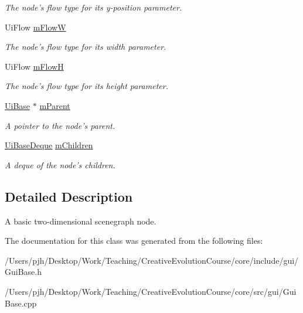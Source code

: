 \begin{DoxyCompactItemize}
\begin{DoxyCompactList}\small\item\em The node's flow type for its y-\/position parameter. \end{DoxyCompactList}\item 
\hypertarget{class_ui_base_af8f47bdc8465b12fad332162c957357e}{Ui\-Flow \hyperlink{class_ui_base_af8f47bdc8465b12fad332162c957357e}{m\-Flow\-W}}\label{class_ui_base_af8f47bdc8465b12fad332162c957357e}

\begin{DoxyCompactList}\small\item\em The node's flow type for its width parameter. \end{DoxyCompactList}\item 
\hypertarget{class_ui_base_a0d0579e8e5dd16cdf1b8ee7cdffaf198}{Ui\-Flow \hyperlink{class_ui_base_a0d0579e8e5dd16cdf1b8ee7cdffaf198}{m\-Flow\-H}}\label{class_ui_base_a0d0579e8e5dd16cdf1b8ee7cdffaf198}

\begin{DoxyCompactList}\small\item\em The node's flow type for its height parameter. \end{DoxyCompactList}\item 
\hypertarget{class_ui_base_a2c6e6fd6ef64f0ec68a5801e86561cc2}{\hyperlink{class_ui_base}{Ui\-Base} $\ast$ \hyperlink{class_ui_base_a2c6e6fd6ef64f0ec68a5801e86561cc2}{m\-Parent}}\label{class_ui_base_a2c6e6fd6ef64f0ec68a5801e86561cc2}

\begin{DoxyCompactList}\small\item\em A pointer to the node's parent. \end{DoxyCompactList}\item 
\hypertarget{class_ui_base_aa17396ca724618461a0e457a26a2b805}{\hyperlink{class_ui_base_a9a56b225c8af039ff8a5e678cf4668d2}{Ui\-Base\-Deque} \hyperlink{class_ui_base_aa17396ca724618461a0e457a26a2b805}{m\-Children}}\label{class_ui_base_aa17396ca724618461a0e457a26a2b805}

\begin{DoxyCompactList}\small\item\em A deque of the node's children. \end{DoxyCompactList}\end{DoxyCompactItemize}


\subsection{Detailed Description}
A basic two-\/dimensional scenegraph node. 

The documentation for this class was generated from the following files\-:\begin{DoxyCompactItemize}
\item 
/\-Users/pjh/\-Desktop/\-Work/\-Teaching/\-Creative\-Evolution\-Course/core/include/gui/Gui\-Base.\-h\item 
/\-Users/pjh/\-Desktop/\-Work/\-Teaching/\-Creative\-Evolution\-Course/core/src/gui/Gui\-Base.\-cpp\end{DoxyCompactItemize}
